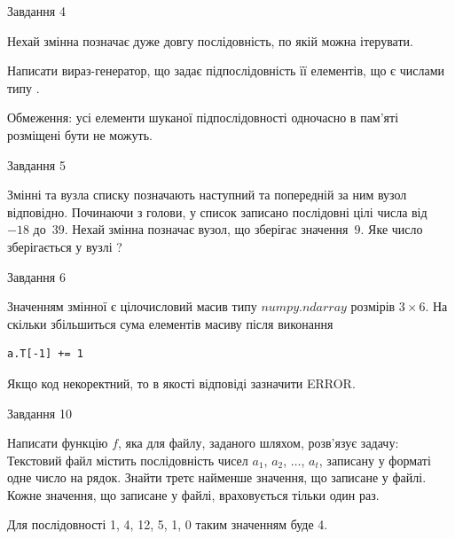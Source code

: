 \documentclass[12pt, ukrainian]{article}
\begin{document}
{\begin{minipage}[t]{8.0cm}
\begin{verbatim}
\end{verbatim}            

\end{minipage}


               
{\begin{center}Завдання {4}\end{center}}
\vspace{-4mm}
Нехай змінна  позначає дуже довгу послідовність, по якій можна ітерувати.

Написати вираз-генератор, що задає підпослідовність її елементів, що є числами типу .

Обмеження: усі елементи шуканої підпослідовності одночасно в пам'яті розміщені бути не можуть.\par

\vspace{10mm}
               
{\begin{center}Завдання {5}\end{center}}
\vspace{-4mm}
Змінні  та  вузла списку позначають наступний та попередній за ним вузол відповідно. Починаючи з голови, у список записано послідовні цілі числа від~$-18$ до~$39$. Нехай змінна  позначає вузол, що зберігає значення~$9$.
Яке число зберігається у вузлі  ?\par

               
{\begin{center}Завдання {6}\end{center}}
\vspace{-4mm}
Значенням змінної  є цілочисловий масив типу $numpy.ndarray$ розмірів $3{\times}6$. На скільки збільшиться сума елементів масиву  після виконання
\begin{verbatim}
a.T[-1] += 1
\end{verbatim}


Якщо код некоректний, то в якості відповіді зазначити ERROR.\par

               
{\begin{center}Завдання {10}\end{center}}
\vspace{-4mm}

Написати функцію $f$, яка для файлу, заданого шляхом, розв’язує задачу:\\ Текстовий файл містить послідовність чисел $a_1$, $a_2$, $\ldots$, $a_t$, записану у форматі одне число на рядок. Знайти третє найменше значення, що записане у файлі. Кожне значення, що записане у файлі, враховується тільки один раз. \par
Для послідовності 1, 4, 12, 5, 1, 0 таким значенням буде 4.

}
\end{document}

